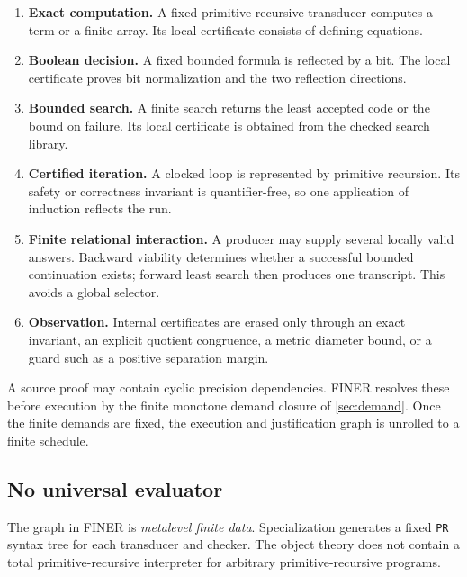 \begin{enumerate}[label=\textbf{N\arabic*.},leftmargin=3.2em]
\item \textbf{Exact computation.}  A fixed primitive-recursive transducer computes a term or a finite array.  Its local certificate consists of defining equations.

\item \textbf{Boolean decision.}  A fixed bounded formula is reflected by a bit.  The local certificate proves bit normalization and the two reflection directions.

\item \textbf{Bounded search.}  A finite search returns the least accepted code or the bound on failure.  Its local certificate is obtained from the checked search library.

\item \textbf{Certified iteration.}  A clocked loop is represented by primitive recursion.  Its safety or correctness invariant is quantifier-free, so one application of \iPRA{} induction reflects the run.

\item \textbf{Finite relational interaction.}  A producer may supply several locally valid answers.  Backward viability determines whether a successful bounded continuation exists; forward least search then produces one transcript.  This avoids a global selector.

\item \textbf{Observation.}  Internal certificates are erased only through an exact invariant, an explicit quotient congruence, a metric diameter bound, or a guard such as a positive separation margin.
\end{enumerate}

A source proof may contain cyclic precision dependencies.  FINER resolves these before execution by the finite monotone demand closure of \cref{sec:demand}.  Once the finite demands are fixed, the execution and justification graph is unrolled to a finite schedule.

\subsection{No universal evaluator}

The graph in FINER is \emph{metalevel finite data}.  Specialization generates a fixed \texttt{PR} syntax tree for each transducer and checker.  The object theory does not contain a total primitive-recursive interpreter for arbitrary primitive-recursive programs.

